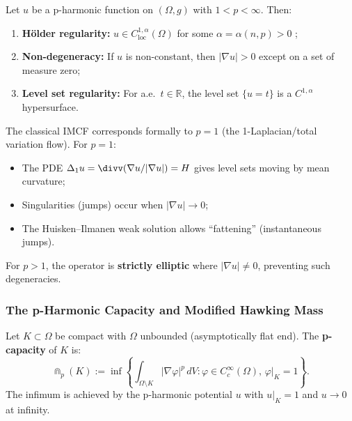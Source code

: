 \begin{theorem}\label{thm:p-harmonic-regularity}
Let $u$ be a p-harmonic function on $(\Omega, g)$ with $1 < p < \infty$. Then:
\begin{enumerate}
\item \textbf{H\"older regularity:} $u \in C^{1,\alpha}_{\mathrm{loc}}(\Omega)$ for some $\alpha = \alpha(n, p) > 0$ \cite{lewis1983,lindqvist2017};
\item \textbf{Non-degeneracy:} If $u$ is non-constant, then $|\nabla u| > 0$ except on a set of measure zero;
\item \textbf{Level set regularity:} For a.e.\ $t \in \mathbb{R}$, the level set $\{u = t\}$ is a $C^{1,\alpha}$ hypersurface.
\end{enumerate}
\end{theorem}

\begin{remark}
The classical IMCF corresponds formally to $p = 1$ (the 1-Laplacian/total variation flow). For $p = 1$:
\begin{itemize}
\item The PDE $\Delta_1 u = \divv(\nabla u/|\nabla u|) = H$ gives level sets moving by mean curvature;
\item Singularities (jumps) occur when $|\nabla u| \to 0$;
\item The Huisken--Ilmanen weak solution allows ``fattening'' (instantaneous jumps).
\end{itemize}
For $p > 1$, the operator is \textbf{strictly elliptic} where $|\nabla u| \neq 0$, preventing such degeneracies.
\end{remark}

\subsubsection{The p-Harmonic Capacity and Modified Hawking Mass}

\begin{definition}[p-Capacity]\label{def:p-capacity}
Let $K \subset \Omega$ be compact with $\Omega$ unbounded (asymptotically flat end). The \textbf{p-capacity} of $K$ is:
\begin{equation}
\Cap_p(K) := \inf\left\{ \int_{\Omega \setminus K} |\nabla \varphi|^p \, dV : \varphi \in C^\infty_c(\Omega), \, \varphi|_K = 1 \right\}.
\end{equation}
The infimum is achieved by the p-harmonic potential $u$ with $u|_K = 1$ and $u \to 0$ at infinity.
\end{definition}

